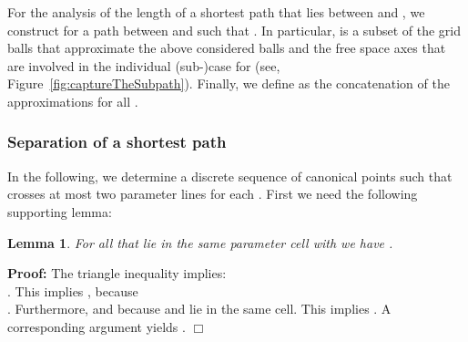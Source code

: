 \documentclass[a4paper,11pt]{article}
\newtheorem{lemma}{Lemma}
\newenvironment{proof}{\textbf{Proof:}}{\hspace*{0mm}\hfill\ensuremath{\Box}}
\begin{document}
	For the analysis of the length of a shortest path  that lies between  and , we construct for  a path  between  and  such that . In particular,  is a subset of the grid balls that approximate the above considered balls and the free space axes that are involved in the individual (sub-)case for  (see, Figure~\ref{fig:captureTheSubpath}). Finally, we define  as the concatenation of the approximations  for all .
		
\subsubsection{Separation of a shortest path}\label{subsec:Sep}
	
	In the following, we determine a discrete sequence of canonical points  such that  crosses at most two parameter lines for each . First we need the following supporting lemma:
	
\begin{lemma}\label{lem:tech}
	For all  that lie in the same parameter cell with  we have .
\end{lemma}
\begin{proof}
	The triangle inequality implies:\\
	 . This implies , 
because\\ . Furthermore,  and  because  and  lie in the same cell. This implies . 	A corresponding argument yields .
\end{proof}
\end{document}
